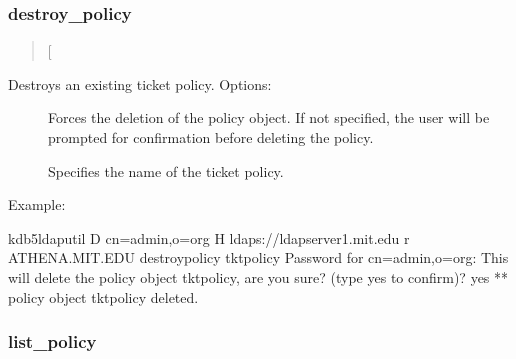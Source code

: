 \documentclass[letterpaper,10pt,english]{sphinxmanual}
\begin{document}
\subsubsection{destroy\_policy}
\label{\detokenize{admin/admin_commands/kdb5_ldap_util:destroy-policy}}\label{\detokenize{admin/admin_commands/kdb5_ldap_util:kdb5-ldap-util-view-policy-end}}\label{\detokenize{admin/admin_commands/kdb5_ldap_util:kdb5-ldap-util-destroy-policy}}\begin{quote}

\sphinxAtStartPar
{}
{[}\sphinxstylestrong{\sphinxhyphen{}force}{]}
\end{quote}

\sphinxAtStartPar
Destroys an existing ticket policy.  Options:
\begin{description}
\item[{}] \leavevmode
\sphinxAtStartPar
Forces the deletion of the policy object.  If not specified, the
user will be prompted for confirmation before deleting the policy.

\item[{}] \leavevmode
\sphinxAtStartPar
Specifies the name of the ticket policy.

\end{description}

\sphinxAtStartPar
Example:

\begin{sphinxVerbatim}[commandchars=\\\{\}]
kdb5\PYGZus{}ldap\PYGZus{}util \PYGZhy{}D cn=admin,o=org \PYGZhy{}H ldaps://ldap\PYGZhy{}server1.mit.edu
    \PYGZhy{}r ATHENA.MIT.EDU destroy\PYGZus{}policy tktpolicy
Password for \PYGZdq{}cn=admin,o=org\PYGZdq{}:
This will delete the policy object \PYGZsq{}tktpolicy\PYGZsq{}, are you sure?
(type \PYGZsq{}yes\PYGZsq{} to confirm)? yes
** policy object \PYGZsq{}tktpolicy\PYGZsq{} deleted.
\end{sphinxVerbatim}


\subsubsection{list\_policy}
\label{\detokenize{admin/admin_commands/kdb5_ldap_util:list-policy}}\label{\detokenize{admin/admin_commands/kdb5_ldap_util:kdb5-ldap-util-destroy-policy-end}}\label{\detokenize{admin/admin_commands/kdb5_ldap_util:kdb5-ldap-util-list-policy}}\begin{quote}

\sphinxAtStartPar
{}
\end{quote}
\end{document}
